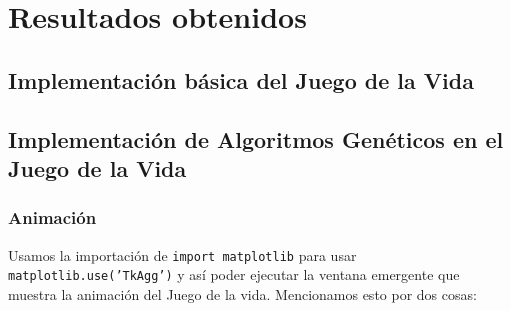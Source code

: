 \section{Resultados obtenidos}

\subsection{Implementación básica del Juego de la Vida}




\subsection{Implementación de Algoritmos Genéticos en el Juego de la Vida}

\subsubsection*{Animación}

Usamos la importación de \texttt{import matplotlib} para usar \texttt{matplotlib.use('TkAgg')}
y así poder ejecutar la ventana emergente que muestra la animación del Juego de la vida. 
Mencionamos esto por dos cosas:

